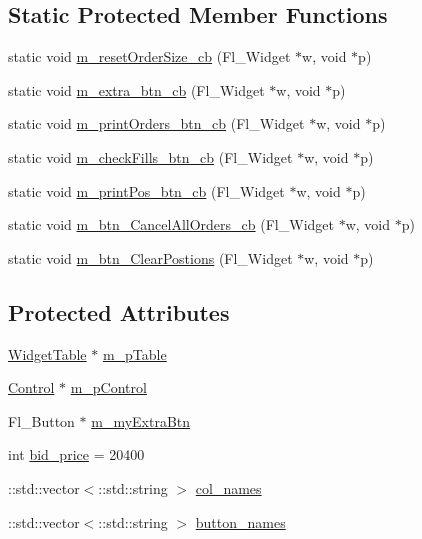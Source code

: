 \subsection*{Static Protected Member Functions}
\begin{DoxyCompactItemize}
\item 
static void \hyperlink{class_mike_1_1_user_interface_base_ad438c7558df623165da5070d41dd3561}{m\+\_\+reset\+Order\+Size\+\_\+cb} (Fl\+\_\+\+Widget $\ast$w, void $\ast$p)
\item 
static void \hyperlink{class_mike_1_1_user_interface_base_aeb8db80038bcb02e65b188c96a84985c}{m\+\_\+extra\+\_\+btn\+\_\+cb} (Fl\+\_\+\+Widget $\ast$w, void $\ast$p)
\item 
static void \hyperlink{class_mike_1_1_user_interface_base_a2dce036ed966a3a2ede063197ca30e1a}{m\+\_\+print\+Orders\+\_\+btn\+\_\+cb} (Fl\+\_\+\+Widget $\ast$w, void $\ast$p)
\item 
static void \hyperlink{class_mike_1_1_user_interface_base_a1f47ae3583c78cd13f3de566f1583ae3}{m\+\_\+check\+Fills\+\_\+btn\+\_\+cb} (Fl\+\_\+\+Widget $\ast$w, void $\ast$p)
\item 
static void \hyperlink{class_mike_1_1_user_interface_base_abcfd0e8bffab60ceb9892635b8b06130}{m\+\_\+print\+Pos\+\_\+btn\+\_\+cb} (Fl\+\_\+\+Widget $\ast$w, void $\ast$p)
\item 
static void \hyperlink{class_mike_1_1_user_interface_base_a29cc254adb1d358370a4be6a3ea02d8a}{m\+\_\+btn\+\_\+\+Cancel\+All\+Orders\+\_\+cb} (Fl\+\_\+\+Widget $\ast$w, void $\ast$p)
\item 
static void \hyperlink{class_mike_1_1_user_interface_base_a423d89d55cc12eee96c6d679b88313a0}{m\+\_\+btn\+\_\+\+Clear\+Postions} (Fl\+\_\+\+Widget $\ast$w, void $\ast$p)
\end{DoxyCompactItemize}
\subsection*{Protected Attributes}
\begin{DoxyCompactItemize}
\item 
\hyperlink{class_mike_1_1_widget_table}{Widget\+Table} $\ast$ \hyperlink{class_mike_1_1_user_interface_base_a56b0885c73939b643bd43f7e08f354aa}{m\+\_\+p\+Table}
\item 
\hyperlink{class_mike_1_1_control}{Control} $\ast$ \hyperlink{class_mike_1_1_user_interface_base_a54da7e6218d2c09481b0804257bd989d}{m\+\_\+p\+Control}
\item 
Fl\+\_\+\+Button $\ast$ \hyperlink{class_mike_1_1_user_interface_base_aefa6f3786f9bed8b9ec54c1a65c90b37}{m\+\_\+my\+Extra\+Btn}
\item 
int \hyperlink{class_mike_1_1_user_interface_base_a1c3c746313e0a033040696169a9f46d8}{bid\+\_\+price} = 20400
\item 
\+::std\+::vector$<$\+::std\+::string $>$ \hyperlink{class_mike_1_1_user_interface_base_a9de8526205e04a7d4c2ea9e1486050a8}{col\+\_\+names}
\item 
\+::std\+::vector$<$\+::std\+::string $>$ \hyperlink{class_mike_1_1_user_interface_base_a541ac5799c899bf3dfad6532d0686bd1}{button\+\_\+names}
\end{DoxyCompactItemize}
